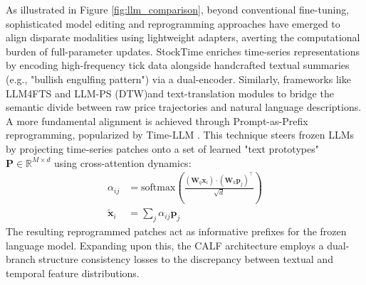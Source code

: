 As illustrated in Figure \ref{fig:llm_comparison}, beyond conventional fine-tuning, sophisticated model editing and reprogramming approaches have emerged to align disparate modalities using lightweight adapters, averting the computational burden of full-parameter updates. StockTime \citep{wang2024stocktime} enriches time-series representations by encoding high-frequency tick data alongside handcrafted textual summaries (e.g., "bullish engulfing pattern") via a dual-encoder. Similarly, frameworks like LLM4FTS \citep{liu2025llm4fts} and LLM-PS \citep{tang2025llmps} (DTW)and text-translation modules to bridge the semantic divide between raw price trajectories and natural language descriptions. A more fundamental alignment is achieved through Prompt-as-Prefix reprogramming, popularized by Time-LLM \citep{jin2024timellm}. This technique steers frozen LLMs by projecting time-series patches onto a set of learned "text prototypes" $\mathbf{P} \in \mathbb{R}^{M \times d}$ using cross-attention dynamics:
\begin{align}
\alpha_{ij} &= \text{softmax} \left(\frac{(\mathbf{W}_q \mathbf{x}_i) \cdot (\mathbf{W}_k \mathbf{p}_j)^\top}{\sqrt{d}}\right) \\
\tilde{\mathbf{x}}_i &= \sum_j \alpha_{ij} \mathbf{p}_j
\end{align}
The resulting reprogrammed patches act as informative prefixes for the frozen language model. Expanding upon this, the CALF architecture \citep{liu2025calf} employs a dual-branch structure consistency losses to the discrepancy between textual and temporal feature distributions.

